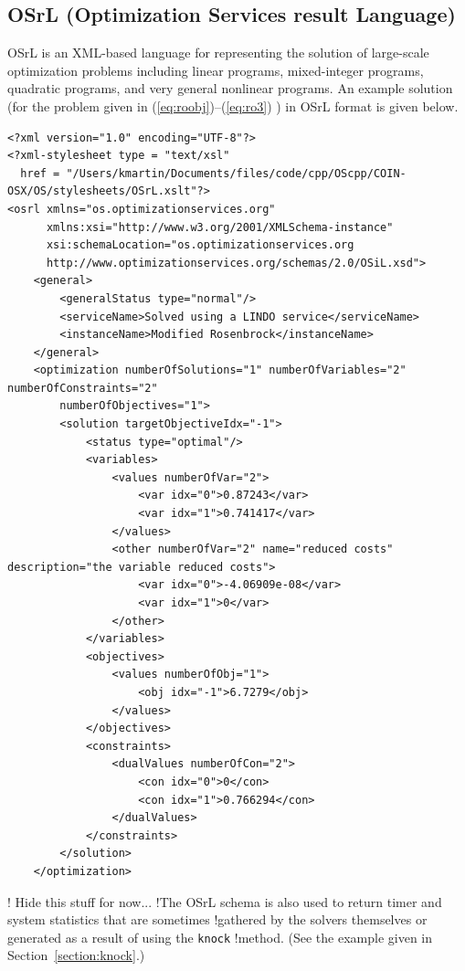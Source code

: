 \documentclass[11pt]{article}
\renewcommand{\_}{{\char"5F}}
\renewcommand{\{}{{\char"7B}}
\renewcommand{\}}{{\char"7D}}
\renewcommand{\^}{{\char"0D}}
\renewcommand{\'}{{\char"0D}}
\begin{document}
\begin{enumerate}[Step 1:]
\subsection{OSrL (Optimization Services result Language)} \label{section:osrlschema}
OSrL is an XML-based language for representing the solution of large-scale
optimization problems including linear programs, mixed-integer programs,
quadratic programs, and very general nonlinear programs.  An example solution (for the problem given in
 (\ref{eq:roobj})--(\ref{eq:ro3}) ) in OSrL format is given below.

{\small
\begin{verbatim}
<?xml version="1.0" encoding="UTF-8"?>
<?xml-stylesheet type = "text/xsl"
  href = "/Users/kmartin/Documents/files/code/cpp/OScpp/COIN-OSX/OS/stylesheets/OSrL.xslt"?>
<osrl xmlns="os.optimizationservices.org"
      xmlns:xsi="http://www.w3.org/2001/XMLSchema-instance"
      xsi:schemaLocation="os.optimizationservices.org
      http://www.optimizationservices.org/schemas/2.0/OSiL.xsd">
    <general>
        <generalStatus type="normal"/>
        <serviceName>Solved using a LINDO service</serviceName>
        <instanceName>Modified Rosenbrock</instanceName>
    </general>
    <optimization numberOfSolutions="1" numberOfVariables="2" numberOfConstraints="2"
        numberOfObjectives="1">
        <solution targetObjectiveIdx="-1">
            <status type="optimal"/>
            <variables>
                <values numberOfVar="2">
                    <var idx="0">0.87243</var>
                    <var idx="1">0.741417</var>
                </values>
                <other numberOfVar="2" name="reduced costs" description="the variable reduced costs">
                    <var idx="0">-4.06909e-08</var>
                    <var idx="1">0</var>
                </other>
            </variables>
            <objectives>
                <values numberOfObj="1">
                    <obj idx="-1">6.7279</obj>
                </values>
            </objectives>
            <constraints>
                <dualValues numberOfCon="2">
                    <con idx="0">0</con>
                    <con idx="1">0.766294</con>
                </dualValues>
            </constraints>
        </solution>
    </optimization>
\end{verbatim}
}
! Hide this stuff for now...
!The OSrL schema is also used to return timer and system statistics that are sometimes 
!gathered by the solvers themselves or generated as a result of using the {\tt knock} 
!method. (See the example given in Section~\ref{section:knock}.)




\end{enumerate}
\end{document}
